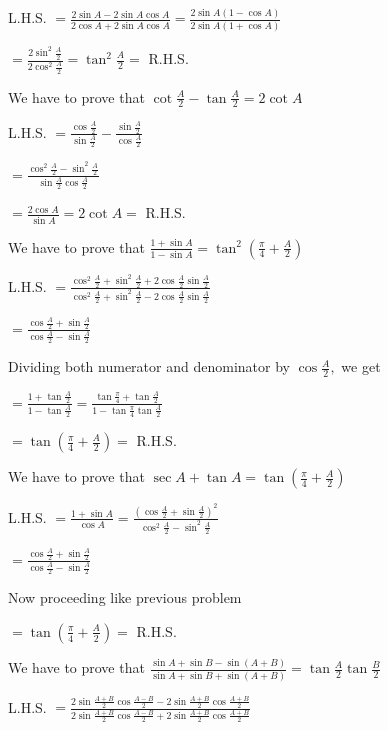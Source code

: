   L.H.S. $= \frac{2\sin A - 2\sin A\cos A}{2\cos A + 2\sin A\cos A} = \frac{2\sin A(1 - \cos A)}{2\sin A(1 + \cos A)}$

  $= \frac{2\sin^2\frac{A}{2}}{2\cos^2\frac{A}{2}} = \tan^2\frac{A}{2} =$ R.H.S.

\item We have to prove that $\cot \frac{A}{2} - \tan \frac{A}{2} = 2\cot A$

  L.H.S. $= \frac{\cos \frac{A}{2}}{\sin \frac{A}{2}} - \frac{\sin \frac{A}{2}}{\cos\frac{A}{2}}$

  $= \frac{\cos^2\frac{A}{2} - \sin^2\frac{A}{2}}{\sin \frac{A}{2}\cos\frac{A}{2}}$

  $= \frac{2\cos A}{\sin A} = 2\cot A =$ R.H.S.

\item We have to prove that $\frac{1 + \sin A}{1 - \sin A} = \tan^2\left(\frac{\pi}{4} + \frac{A}{2}\right)$

  L.H.S. $= \frac{\cos^2\frac{A}{2} + \sin^2\frac{A}{2} + 2\cos \frac{A}{2}\sin\frac{A}{2}}{\cos^2\frac{A}{2} +
    \sin^2\frac{A}{2} - 2\cos \frac{A}{2}\sin\frac{A}{2}}$

  $= \frac{\cos \frac{A}{2} + \sin \frac{A}{2}}{\cos \frac{A}{2} - \sin \frac{A}{2}}$

  Dividing both numerator and denominator by $\cos \frac{A}{2},$ we get

  $= \frac{1 + \tan\frac{A}{2}}{1 - \tan \frac{A}{2}} = \frac{\tan\frac{\pi}{4} + \tan \frac{A}{2}}{1 -
    \tan\frac{\pi}{4}\tan\frac{A}{2}}$

  $= \tan\left(\frac{\pi}{4} + \frac{A}{2}\right) =$ R.H.S.

\item We have to prove that $\sec A + \tan A = \tan\left(\frac{\pi}{4} + \frac{A}{2}\right)$

  L.H.S. $= \frac{1 + \sin A}{\cos A} = \frac{\left(\cos\frac{A}{2} + \sin\frac{A}{2}\right)^2}{\cos^2\frac{A}{2} -
    \sin^2\frac{A}{2}}$

  $= \frac{\cos \frac{A}{2} + \sin \frac{A}{2}}{\cos \frac{A}{2} - \sin \frac{A}{2}}$

  Now proceeding like previous problem

  $= \tan\left(\frac{\pi}{4} + \frac{A}{2}\right) =$ R.H.S.

\item We have to prove that $\frac{\sin A + \sin B - \sin(A + B)}{\sin A + \sin B + \sin(A + B)} = \tan \frac{A}{2}\tan
  \frac{B}{2}$

  L.H.S. $= \frac{2\sin\frac{A + B}{2}\cos\frac{A - B}{2} - 2\sin \frac{A + B}{2}\cos\frac{A + B}{2}}{2\sin\frac{A +
      B}{2}\cos\frac{A - B}{2} + 2\sin \frac{A + B}{2}\cos\frac{A + B}{2}}$

